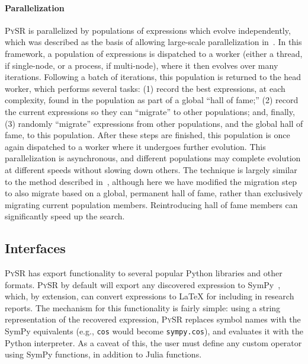 \documentclass[letterpaper,twocolumn]{scrartcl}
\newcommand\we{we\xspace}
\newcommand\pysr{\textsc{PySR}\xspace}
\begin{document}
\paragraph{Parallelization}

\pysr is parallelized by populations of expressions which evolve independently, which was described as the basis of allowing large-scale parallelization in~\cite{goldbergComparativeAnalysisSelection1991}.
In this framework, a population of expressions is dispatched to a worker (either a thread, if single-node, or a process, if multi-node), where it then evolves over many iterations.
Following a batch of iterations, this population is returned to the head worker, which performs several tasks:
(1) record the best expressions, at each complexity, found in the population as part of a global ``hall of fame;''
(2) record the current expressions so they can ``migrate'' to other populations; and, finally,
(3) randomly ``migrate'' expressions from other populations, and the global hall of fame, to this population.
After these steps are finished, this population is once again dispatched to a worker where it undergoes further evolution.
This parallelization is asynchronous, and different populations may complete evolution at different speeds without slowing down others.
The technique is largely similar to the method described in~\cite{schmidtDistillingFreeFormNatural2009}, although here \we have modified the migration step to also migrate based on a global, permanent hall of fame, rather than exclusively migrating current population members.
Reintroducing hall of fame members can significantly speed up the search.


\subsection{Interfaces}
\label{sec:interfaces}

\pysr has export functionality to several popular Python libraries and other formats.
\pysr by default will export any discovered expression to SymPy~\cite{sympy}, which, by extension, can convert expressions to LaTeX for including in research reports.
The mechanism for this functionality is fairly simple: using a string representation of the recovered expression, \pysr replaces symbol names with the SymPy equivalents (e.g., \texttt{cos} would become \texttt{sympy.cos}),
and evaluates it with the Python interpreter.
As a caveat of this, the user must define any custom operator using SymPy functions, in addition to Julia functions.
\end{document}
